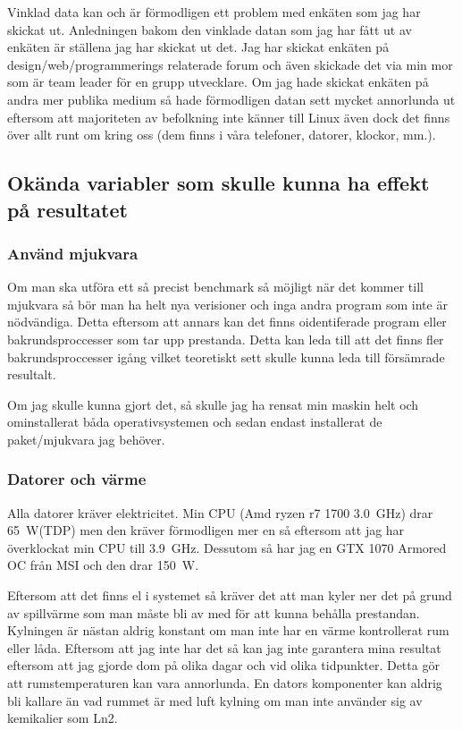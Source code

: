 \documentclass[12pt, a4paper]{report}
\begin{document}
Vinklad data kan och är förmodligen ett problem med enkäten som jag har skickat ut. Anledningen bakom den vinklade datan som jag har fått ut av enkäten är ställena jag har skickat ut det. Jag har skickat enkäten på design/web/programmerings relaterade forum och även skickade det via min mor som är team leader för en grupp utvecklare. Om jag hade skickat enkäten på andra mer publika medium så hade förmodligen datan sett mycket annorlunda ut eftersom att majoriteten av befolkning inte känner till Linux även dock det finns över allt runt om kring oss (dem finns i våra telefoner, datorer, klockor, mm.). 

\subsection{Okända variabler som skulle kunna ha effekt på resultatet}


\subsubsection{Använd mjukvara}

Om man ska utföra ett så precist benchmark så möjligt när det kommer till mjukvara så bör man ha helt nya verisioner och inga andra program som inte är nödvändiga. Detta eftersom att annars kan det finns oidentiferade program eller bakrundsproccesser som tar upp prestanda. Detta kan leda till att det finns fler bakrundsproccesser igång vilket teoretiskt sett skulle kunna leda till försämrade resultalt.

Om jag skulle kunna gjort det, så skulle jag ha rensat min maskin helt och ominstallerat båda operativsystemen och sedan endast installerat de paket/mjukvara jag behöver.

\subsubsection{Datorer och värme}

Alla datorer kräver elektricitet. Min CPU (Amd ryzen r7 1700 \SI{3.0}{\giga\hertz}) drar \SI{65}{\watt}(TDP)\cite{ryzen1700spec} men den kräver förmodligen mer en så eftersom att jag har överklockat min CPU till \SI{3.9}{\giga\hertz}.
Dessutom så har jag en GTX 1070 Armored OC från MSI\cite{1070} och den drar \SI{150}{\watt}.

Eftersom att det finns el i systemet så kräver det att man kyler ner det på grund av spillvärme\cite{wasteheat} som man måste bli av med för att kunna behålla prestandan. Kylningen är nästan aldrig konstant om man inte har en värme kontrollerat rum eller låda. Eftersom att jag inte har det så kan jag inte garantera mina resultat eftersom att jag gjorde dom på olika dagar och vid olika tidpunkter. Detta gör att rumstemperaturen kan vara annorlunda. En dators komponenter kan aldrig bli kallare än vad rummet är med luft kylning\cite{thermodynamics} om man inte använder sig av kemikalier som Ln2.
\end{document}
